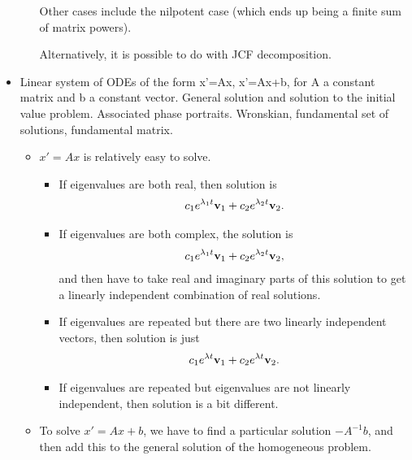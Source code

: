 \documentclass{article}
\begin{document}
\begin{itemize}
\begin{itemize}
        Other cases include the nilpotent case (which ends up being a finite sum of matrix powers).

        Alternatively, it is possible to do with JCF decomposition.

    \end{itemize}



  \item  Linear system of ODEs of the form x'=Ax, x'=Ax+b, for A a constant matrix and b a constant vector. General solution and solution to the initial value problem. Associated phase portraits. Wronskian, fundamental set of solutions, fundamental matrix.

    \begin{itemize}
      \item $x ' = Ax$ is relatively easy to solve.

        \begin{itemize}
          \item If eigenvalues are both real, then solution is
            \begin{align*}
              c_1 e^{\lambda_1 t} \mathbf{v}_1 + c_2 e^{\lambda_2 t} \mathbf{v}_2.
            \end{align*}
          \item If eigenvalues are both complex, the solution is
            \begin{align*}
              c_1 e^{\lambda_1 t} \mathbf{v}_1 + c_2 e^{\lambda_2 t} \mathbf{v}_2,
            \end{align*}
            and then have to take real and imaginary parts of this solution to get a linearly independent combination of real solutions.
          \item If eigenvalues are repeated but there are two linearly independent vectors, then solution is just
            \begin{align*}
              c_1 e^{\lambda t} \mathbf{v}_1 + c_2 e^{\lambda t} \mathbf{v}_2.
            \end{align*}

          \item If eigenvalues are repeated but eigenvalues are not linearly independent, then solution is a bit different.
        \end{itemize}
      \item To solve $x' = Ax + b$, we have to find a particular solution $- A^{-1} b$, and then add this to the general solution of the homogeneous problem.


\end{itemize}
\end{itemize}
\end{document}
